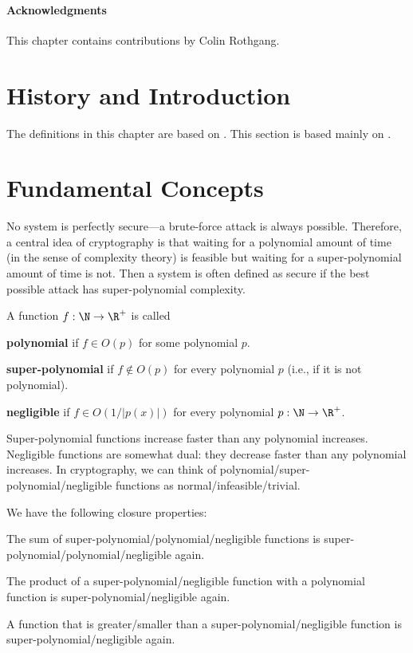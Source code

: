 \paragraph{Acknowledgments}This chapter contains contributions by Colin Rothgang.

\section{History and Introduction}\label{sec:sd:crypto:hist}
The definitions in this chapter are based on \cite{PuMaC2016}. 
This section is based mainly on \cite{cryptoNetworkSlides}. 


\section{Fundamental Concepts}

No system is perfectly secure---a brute-force attack is always possible.
Therefore, a central idea of cryptography is that waiting for a polynomial amount of time (in the sense of complexity theory) is feasible but waiting for a super-polynomial amount of time is not.
Then a system is often defined as secure if the best possible attack has super-polynomial complexity.

\begin{definition}
 A function $f:\N\to\R^+$ is called
  \begin{compactitem}
   \item \textbf{polynomial} if $f\in O(p)$ for some polynomial $p$.
   \item \textbf{super-polynomial} if $f\nin O(p)$ for every polynomial $p$ (i.e., if it is not polynomial).
   \item \textbf{negligible} if $f\in O(1/|p(x)|)$ for every polynomial $p:\N\to\R^+$.
  \end{compactitem}
\end{definition}

Super-polynomial functions increase faster than any polynomial increases.
Negligible functions are somewhat dual: they decrease faster than any polynomial increases.
In cryptography, we can think of polynomial/super-polynomial/negligible functions as normal/infeasible/trivial.

\begin{theorem}
We have the following closure properties:
\begin{compactitem}
 \item The sum of super-polynomial/polynomial/negligible functions is super-polynomial/polynomial/negligible again.
 \item The product of a super-polynomial/negligible function with a polynomial function is super-polynomial/negligible again.
 \item A function that is greater/smaller than a super-polynomial/negligible function is super-polynomial/negligible again.
\end{compactitem}
\end{theorem}


